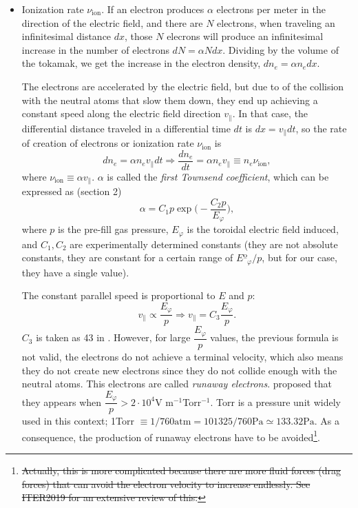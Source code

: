 \documentclass[a4paper,12pt,oneside]{book}
\begin{document}
\begin{itemize}

	\item Ionization rate $\nu_\text{ion}$. If an electron produces $\alpha$ electrons per meter in the direction of the electric field, and there are $N$ electrons, when traveling an infinitesimal distance $dx$, those $N$ elecrons will produce an infinitesimal increase in the number of electrons $dN=\alpha N dx$. Dividing by the volume of the tokamak, we get the increase in the electron density, $dn_e=\alpha n_e dx$. 

The electrons are accelerated by the electric field, but due to of the collision with the neutral atoms that slow them down, they end up achieving a constant speed along the electric field direction $v_{\parallel}$. In that case, the differential distance traveled in a differential time $dt$ is $dx=v_{\parallel} dt$, so the rate of creation of electrons or ionization rate $\nu_\text{ion}$ is 
%
	\begin{equation}\label{nu ion}
dn_e=\alpha n_e v_{\parallel} dt \Rightarrow \dfrac{dn_e}{dt}=\alpha n_e v_{\parallel} \equiv n_e \nu_\text{ion},
	\end{equation}
where $\nu_\text{ion} \equiv \alpha v_{\parallel}$. $\alpha$ is called the \textit{first Townsend coefficient}, which can be expressed as \cite{KimThesis} (section 2)
%
	\begin{equation}\label{ec_def_alfa}
\alpha = C_1 p \exp \Big(-\dfrac{C_2 p}{E_\varphi} \Big),
	\end{equation}
where $p$ is the pre-fill gas pressure, $E_\varphi$ is the toroidal electric field induced, and $C_1,C_2$ are experimentally determined constants (they are not absolute constants, they are constant for a certain range of $Eº_\varphi/p$, but for our case, they have a single value). 

The constant parallel speed is proportional to $E$ and $p$:
%
\begin{equation}
v_\parallel \propto \dfrac{E_\varphi}{p} \Rightarrow v_\parallel = C_3 \dfrac{E_\varphi}{p}.
\end{equation}
$C_3$ is taken as 43 in \cite{Lloyd_1991}. However, for large $\dfrac{E_\varphi}{p}$ values, the previous formula is not valid, the electrons do not achieve a terminal velocity, which also means they do not create new electrons since they do not collide enough with the neutral atoms. This electrons are called \textit{runaway electrons}. \cite{Lloyd_1991} proposed that they appears when $\dfrac{E_\varphi}{p}>2 \cdot 10^4 $V m$^{-1}$Torr$^{-1}$. Torr is a pressure unit widely used in this context; 1Torr $\equiv 1/760 \text{atm}=101325/760 \text{Pa} \simeq 133.32 \text{Pa}$. As a consequence, the production of runaway electrons have to be avoided\footnote{\st{Actually, this is more complicated because there are more fluid forces (drag forces) that can avoid the electron velocity to increase endlessly. See ITER2019 for an extensive review of this.}}.


\end{itemize}
\end{document}
